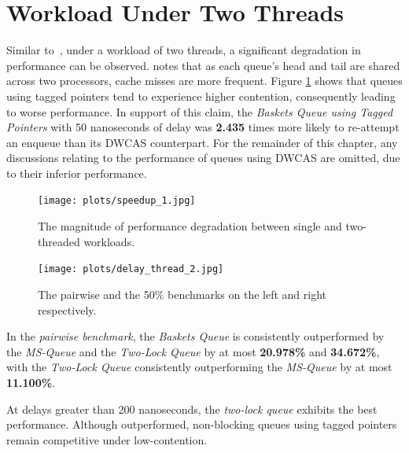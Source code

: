 \section{Workload Under Two Threads}
Similar to~\citep{michael1996simple,hoffman2007baskets,ladan2008optimistic},
under a workload of two threads, a significant degradation in performance can
be observed. \citeauthor{michael1996simple} notes that as each queue's head and
tail are shared across two processors, cache misses are more frequent. 
Figure \ref{fig:perf_deg_1_thread} shows that queues using tagged pointers tend
to experience higher contention, consequently leading to worse performance. 
In support of this claim, the \emph{Baskets Queue using Tagged Pointers} with
50 nanoseconds of delay was \textbf{2.435} times more likely to re-attempt an
enqueue than its DWCAS counterpart. For the remainder of this chapter, any
discussions relating to the performance of queues
using DWCAS are omitted, due to their inferior performance.

\begin{figure}[!ht]
    \centering
    \texttt{[image: plots/speedup\_1.jpg]}
    \caption{The magnitude of performance degradation between single and two-threaded workloads.}
    \label{fig:perf_deg_1_thread}
\end{figure}

\begin{figure}[!ht]
    \centering
    \texttt{[image: plots/delay\_thread\_2.jpg]}
    \caption{The pairwise and the 50\% benchmarks on the left and right respectively.}
    \label{fig:perf_2_thread}
\end{figure}

In the \emph{pairwise benchmark}, the \emph{Baskets Queue} is consistently
outperformed by the \emph{MS-Queue} and the \emph{Two-Lock Queue} by at most
\textbf{20.978\%} and \textbf{34.672\%}, with the \emph{Two-Lock Queue}
consistently outperforming the \emph{MS-Queue} by at most \textbf{11.100\%}.

At delays greater than 200 nanoseconds, the \emph{two-lock queue} exhibits the
best performance.
Although outperformed, non-blocking queues using tagged pointers remain
competitive under low-contention. 


